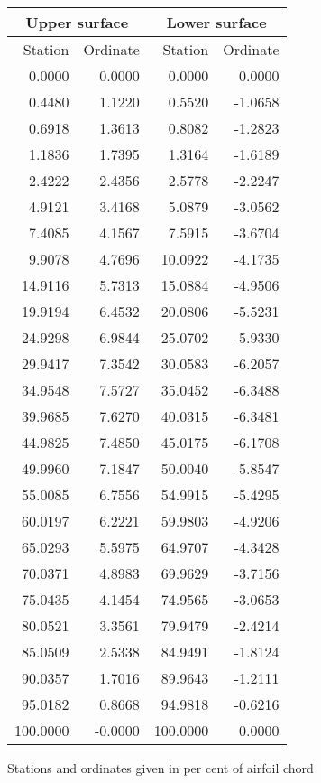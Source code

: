 \documentclass[11pt]{book}
\begin{document}
 \hspace{4mm}
 \begin{tabular}{|r|r|r|r|} \hline 
 \multicolumn{2}{|c|}{Upper surface} & \multicolumn{2}{|c|}{Lower surface} \\
 \hline
 Station & Ordinate & Station & Ordinate \\
 \hline
0.0000 & 0.0000 & 0.0000 & 0.0000 \\
0.4480 & 1.1220 & 0.5520 & -1.0658 \\
0.6918 & 1.3613 & 0.8082 & -1.2823 \\
1.1836 & 1.7395 & 1.3164 & -1.6189 \\
2.4222 & 2.4356 & 2.5778 & -2.2247 \\
4.9121 & 3.4168 & 5.0879 & -3.0562 \\
7.4085 & 4.1567 & 7.5915 & -3.6704 \\
9.9078 & 4.7696 & 10.0922 & -4.1735 \\
14.9116 & 5.7313 & 15.0884 & -4.9506 \\
19.9194 & 6.4532 & 20.0806 & -5.5231 \\
24.9298 & 6.9844 & 25.0702 & -5.9330 \\
29.9417 & 7.3542 & 30.0583 & -6.2057 \\
34.9548 & 7.5727 & 35.0452 & -6.3488 \\
39.9685 & 7.6270 & 40.0315 & -6.3481 \\
44.9825 & 7.4850 & 45.0175 & -6.1708 \\
49.9960 & 7.1847 & 50.0040 & -5.8547 \\
55.0085 & 6.7556 & 54.9915 & -5.4295 \\
60.0197 & 6.2221 & 59.9803 & -4.9206 \\
65.0293 & 5.5975 & 64.9707 & -4.3428 \\
70.0371 & 4.8983 & 69.9629 & -3.7156 \\
75.0435 & 4.1454 & 74.9565 & -3.0653 \\
80.0521 & 3.3561 & 79.9479 & -2.4214 \\
85.0509 & 2.5338 & 84.9491 & -1.8124 \\
90.0357 & 1.7016 & 89.9643 & -1.2111 \\
95.0182 & 0.8668 & 94.9818 & -0.6216 \\
100.0000 & -0.0000 & 100.0000 & 0.0000 \\
 \hline 
 \end{tabular}
 \vspace{8mm}

Stations and ordinates given in per cent of airfoil chord
\end{document}
